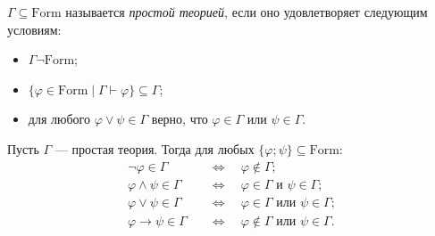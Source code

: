 \documentclass[12pt,a4paper]{article}
\newcommand{\Formul}{\ensuremath{\mathrm{Form}}\xspace}
\begin{document}
    \begin{definition}
        $\Gamma \subseteq \Formul$ называется \emph{простой теорией}, если оно удовлетворяет следующим условиям:
        \begin{itemize}
            \item $\Gamma \neg \Formul$;
            \item $\{\varphi \in \Formul \mid \Gamma \vdash \varphi\} \subseteq \Gamma$;
            \item для любого $\varphi \vee \psi \in \Gamma$ верно, что $\varphi \in \Gamma$ или $\psi \in \Gamma$.
        \end{itemize}
    \end{definition}

    \begin{lemma}
        Пусть $\Gamma$ --- простая теория. Тогда для любых $\{\varphi; \psi\} \subseteq \Formul$:
        \begin{align*}
            \neg \varphi \in \Gamma \quad &\Longleftrightarrow \quad \varphi \notin \Gamma;\\
            \varphi \wedge \psi \in \Gamma \quad &\Longleftrightarrow \quad \varphi \in \Gamma \text{ и } \psi \in \Gamma;\\
            \varphi \vee \psi \in \Gamma \quad &\Longleftrightarrow \quad \varphi \in \Gamma \text{ или } \psi \in \Gamma;\\
            \varphi \rightarrow \psi \in \Gamma \quad &\Longleftrightarrow \quad \varphi \notin \Gamma \text{ или } \psi \in \Gamma.\\
        \end{align*}
    \end{lemma}
\end{document}
